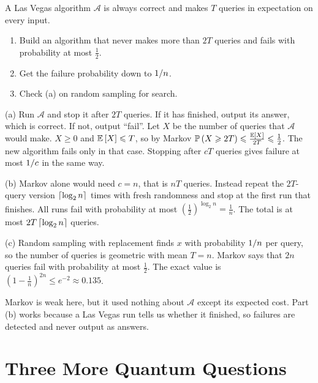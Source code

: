 \begin{exercisebox}
\begin{pproblem}\label{pp:lv-mc}
    A Las Vegas algorithm $\mathcal{A}$ is always correct and makes $T$ queries in expectation on
    every input.
    \begin{enumerate}[label=(\alph*)]
        \item Build an algorithm that never makes more than $2T$ queries and fails with probability
              at most $\frac{1}{2}$.
        \item Get the failure probability down to $1/n$.
        \item Check (a) on random sampling for search.
    \end{enumerate}
\end{pproblem}
\tcblower
\begin{wsolution}
    (a) Run $\mathcal{A}$ and stop it after $2T$ queries. If it has finished, output its answer,
    which is correct. If not, output ``fail''. Let $X$ be the number of queries that $\mathcal{A}$
    would make. $X \geq 0$ and $\operatorname{\mathbb{E}}\left[X\right] \leqslant T$, so by Markov
    $\operatorname{\mathbb{P}}\left(X \geqslant 2T\right) \leqslant \frac{\operatorname{\mathbb{E}}\left[X\right]}{2T} \leqslant \frac{1}{2}$. The new algorithm fails only
    in that case. Stopping after $cT$ queries gives failure at most $1/c$ in the same way.

    (b) Markov alone would need $c = n$, that is $nT$ queries. Instead repeat the $2T$-query version
    $\left\lceil\log_2 n\right\rceil$ times with fresh randomness and stop at the first run that finishes. All runs
    fail with probability at most $\left(\frac{1}{2}\right)^{\log_2 n} = \frac{1}{n}$. The total is
    at most $2T \left\lceil\log_2 n\right\rceil$ queries.

    (c) Random sampling with replacement finds $x$ with probability $1/n$ per query, so the
    number of queries is geometric with mean $T = n$. Markov says that $2n$ queries fail with
    probability at most $\frac{1}{2}$. The exact value is
    $\left(1 - \frac{1}{n}\right)^{2n} \leq e^{-2} \approx 0.135$.

    Markov is weak here, but it used nothing about $\mathcal{A}$ except its expected cost. Part (b)
    works because a Las Vegas run tells us whether it finished, so failures are detected and never
    output as answers.
\end{wsolution}
\end{exercisebox}

\section{Three More Quantum Questions}\label{sec:more}

